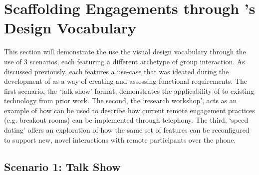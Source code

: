 \section{Scaffolding Engagements through \ONT{}'s Design Vocabulary}
\label{section:scenarios}

This section will demonstrate the use the visual design vocabulary through the use of 3 scenarios, each featuring a different archetype of group interaction. As discussed previously, each features a use-case that was ideated during the development of \ONT{} as a way of creating and assessing functional requirements. The first scenario, the `talk show' format, demonstrates the applicability of \ONT{} to existing technology from prior work. The second, the `research workshop', acts as an example of how \ONT{} can be used to describe how current remote engagement practices (e.g. breakout rooms) can be implemented through telephony. The third, `speed dating' offers an exploration of how the same set of features can be reconfigured to support new, novel interactions with remote participants over the phone.

\subsection{Scenario 1: Talk Show}

